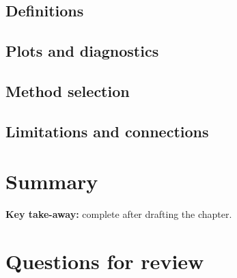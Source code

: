 \subsection{Definitions}


\subsection{Plots and diagnostics}


\subsection{Method selection}


\subsection{Limitations and connections}


\section{Summary}

\begin{notebox}
\textbf{Key take-away:} complete after drafting the chapter.
\end{notebox}

\section{Questions for review}

\solution{4cm}{%
}
